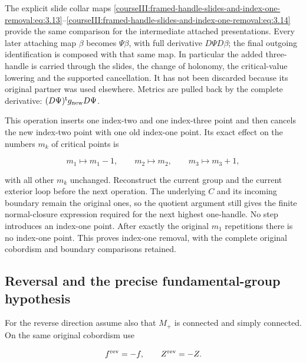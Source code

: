 The explicit slide collar maps \eqref{courseIII:framed-handle-slides-and-index-one-removal:eq:3.13}--\eqref{courseIII:framed-handle-slides-and-index-one-removal:eq:3.14} provide the same comparison for the intermediate attached presentations. Every later attaching map \(\beta\) becomes \(\Psi\beta\), with full derivative \(D\Psi D\beta\); the final outgoing identification is composed with that same map. In particular the added three-handle is carried through the slides, the change of holonomy, the critical-value lowering and the supported cancellation. It has not been discarded because its original partner was used elsewhere. Metrics are pulled back by the complete derivative:
\((D\Psi)^{\mathsf t}g_{\rm new}D\Psi\).

This operation inserts one index-two and one index-three point and then cancels the new index-two point with one old index-one point. Its exact effect on the numbers \(m_k\) of critical points is

\begin{equation}
m_1\longmapsto m_1-1,\qquad
 m_2\longmapsto m_2,\qquad
 m_3\longmapsto m_3+1,
 \label{courseIII:framed-handle-slides-and-index-one-removal:eq:7.15}
\end{equation}

with all other \(m_k\) unchanged. Reconstruct the current group and the current exterior loop before the next operation. The underlying \(C\) and its incoming boundary remain the original ones, so the quotient argument still gives the finite normal-closure expression required for the next highest one-handle. No step introduces an index-one point. After exactly the original \(m_1\) repetitions there is no index-one point. This proves index-one removal, with the complete original cobordism and boundary comparisons retained.

\subsection{Reversal and the precise fundamental-group hypothesis}
\label{courseIII:framed-handle-slides-and-index-one-removal:slide-reversal}

\label{courseIII:framed-handle-slides-and-index-one-removal:section-8}\label{courseIII:low-index-slides:8}

For the reverse direction assume also that \(M_+\) is connected and simply connected. On the same original cobordism use

\begin{equation}
f^{\rm rev}=-f,\qquad Z^{\rm rev}=-Z.
 \label{courseIII:framed-handle-slides-and-index-one-removal:eq:8.1}
\end{equation}

